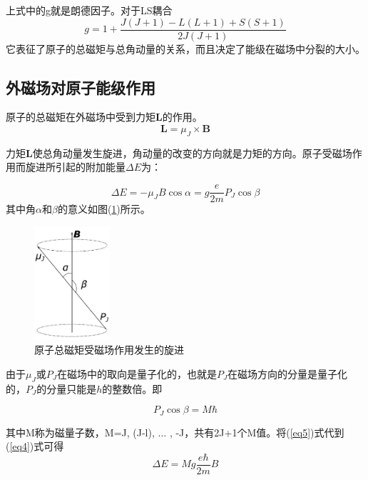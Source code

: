 \documentclass{buaaemp}
\begin{document}
上式中的g就是朗德因子。对于LS耦合
\begin{equation}
g = 1+\frac{J(J+1)-L(L+1)+S(S+1)}{2J(J+1)}\label{eq2}
\end{equation}
它表征了原子的总磁矩与总角动量的关系，而且决定了能级在磁场中分裂的大小。

\subsection{外磁场对原子能级作用}
原子的总磁矩在外磁场中受到力矩$\mathbf{L}$的作用。
\begin{equation}
\mathbf{L} = \mu_{J} \times\mathbf{B} \label{eq3}
\end{equation}

力矩$\mathbf{L}$使总角动量发生旋进，角动量的改变的方向就是力矩的方向。原子受磁场作用而旋进所引起的附加能量$\Delta E$为：

\begin{equation}
\Delta E = -\mu_JB\cos\alpha = g\frac{e}{2m}P_J\cos\beta\label{eq4}
\end{equation}
其中角$\alpha$和$\beta$的意义如图(\ref{fig2})所示。

\begin{figure}
\centering
\includegraphics[width=0.25\textwidth]{fig2.pdf}
\caption{原子总磁矩受磁场作用发生的旋进}\label{fig2}
\end{figure}

由于$\mu_J$或$P_J$在磁场中的取向是量子化的，也就是$P_J$在磁场方向的分量是量子化的，$P_J$的分量只能是$h$的整数倍。即

\begin{equation}
P_J\cos\beta = M\hbar\label{eq5}
\end{equation}

其中M称为磁量子数，M=J, (J-l), $\dots$ , -J，共有2J+1个M值。将(\ref{eq5})式代到(\ref{eq4})式可得
\begin{equation}
\Delta E = Mg\frac{e\hbar}{2m}B\label{eq6}
\end{equation}
\end{document}
